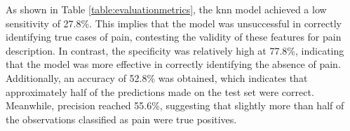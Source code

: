 As shown in Table \ref{table:evaluationmetrics}, the \ac{knn} model achieved a low sensitivity of 27.8\%. This implies that the model was unsuccessful in correctly identifying true cases of pain, contesting the validity of these features for pain description. In contrast, the specificity was relatively high at 77.8\%, indicating that the model was more effective in correctly identifying the absence of pain. Additionally, an accuracy of 52.8\% was obtained, which indicates that approximately half of the predictions made on the test set were correct. Meanwhile, precision reached 55.6\%, suggesting that slightly more than half of the observations classified as pain were true positives. 